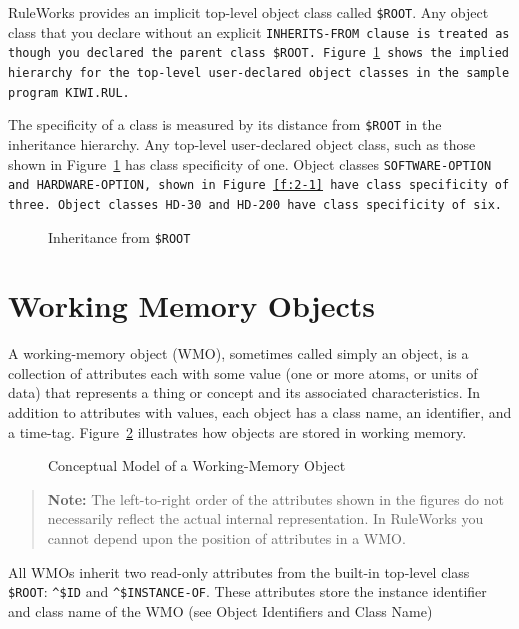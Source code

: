 RuleWorks provides an implicit top-level object class called
\verb|$ROOT|. Any object class that you declare without an explicit
\tt{INHERITS-FROM} clause is treated as though you declared the parent
class \verb|$ROOT|. Figure~\ref{f:2-2} shows the implied hierarchy for
the top-level user-declared object classes in the sample program
\tt{KIWI.RUL}.

The specificity of a class is measured by its distance from
\verb|$ROOT| in the inheritance hierarchy. Any top-level user-declared
object class, such as those shown in Figure~\ref{f:2-2} has class specificity
of one. Object classes \tt{SOFTWARE-OPTION} and \tt{HARDWARE-OPTION},
shown in Figure~\ref{f:2-1} have class specificity of three. Object
classes \tt{HD-30} and \tt{HD-200} have class specificity of six.

\begin{figure}[h]
  \centering
  
  \caption{Inheritance from \tt{\$ROOT}}
  \label{f:2-2}
\end{figure}

\section{Working Memory Objects}

A working-memory object (WMO), sometimes called simply an
object, is a collection of attributes each with some value
(one or more atoms, or units of data) that represents a thing
or concept and its associated characteristics. In addition to
attributes with values, each object has a class name, an
identifier, and a time-tag. Figure~\ref{f:2-3} illustrates how
objects are stored in working memory.

\begin{figure}[h]
  \centering
  
  \caption{Conceptual Model of a Working-Memory Object}
  \label{f:2-3}
\end{figure}

\begin{quote}
  \textbf{Note:} The left-to-right order of the attributes shown in
  the figures do not necessarily reflect the actual internal
  representation. In RuleWorks you cannot depend upon the position of
  attributes in a WMO.
\end{quote}

All WMOs inherit two read-only attributes from the built-in
top-level class \verb|$ROOT|: \verb|^$ID| and \verb|^$INSTANCE-OF|. These
attributes store the instance identifier and class name of
the WMO (see Object Identifiers and Class Name)

